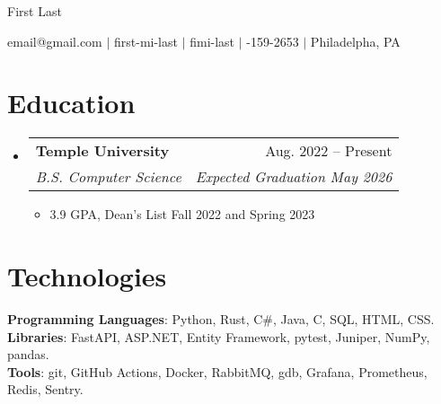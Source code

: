 \documentclass[letterpaper,11pt]{article}
\makeatletter
\newcommand{\resumeItem}[1]{
  \item\small{
    {#1 \vspace{-2pt}}
  }
}
\newcommand{\resumeSubheading}[4]{
  \vspace{-2pt}\item
    \begin{tabular*}{0.97\textwidth}[t]{l@{\extracolsep{\fill}}r}
      \textbf{#1} & #2 \\
      \textit{\small#3} & \textit{\small #4} \\
    \end{tabular*}\vspace{-7pt}
}
\newcommand{\resumeSubheadingListStart}{\begin{itemize}[leftmargin=0.15in, label={}]}
\newcommand{\resumeSubheadingListEnd}{\end{itemize}}
\newcommand{\resumeItemListStart}{\begin{itemize}}
\newcommand{\resumeItemListEnd}{\end{itemize}\vspace{-5pt}}
\newcommand{\myemail}{email@gmail.com}
\newcommand{\myname}{First Last}
\newcommand{\mygh}{first-mi-last}
\newcommand{\mylinkedin}{fimi-last}
\newcommand{\myphone}{314-159-2653}
\newcommand{\myemail}{jonathanzhang929@gmail.com}
\newcommand{\myname}{Jonathan Zhang}
\newcommand{\mygh}{jonathan-d-zhang}
\newcommand{\mylinkedin}{jd-zhang}
\newcommand{\myphone}{484-986-8012}
\makeatother
\begin{document}
{\Huge \myname}
\\
\vspace{2pt}

\small{
    \faEnvelope
    \thinspace \thinspace
    \myemail
    \thinspace \thinspace $|$
    \faGithub
    \thinspace \thinspace
    \mygh
    \thinspace \thinspace $|$
    \faLinkedin
    \thinspace \thinspace
    \mylinkedin
    \thinspace \thinspace $|$
    \faPhone
    \thinspace \thinspace
    \myphone
    \thinspace \thinspace $|$
    \thinspace \thinspace
    Philadelpha, PA
}

\vspace{-11pt}

\section{Education}
  \resumeSubheadingListStart
    \resumeSubheading{Temple University}{Aug. 2022 -- Present}{B.S. Computer Science}{Expected Graduation May 2026}
    \resumeItemListStart
        \resumeItem{3.9 GPA, Dean's List Fall 2022 and Spring 2023}
    \resumeItemListEnd
  \resumeSubheadingListEnd

\section{Technologies}
 \begin{itemize}[leftmargin=0.15in, label={}]
    \small{\item{
    \textbf{Programming Languages}{:
        Python,
        Rust,
        C\#,
        Java,
        C,
        SQL,
        HTML,
        CSS.
    } \\
    \textbf{Libraries}{:
        FastAPI,
        ASP.NET,
        Entity Framework,
        pytest,
        Juniper,
        NumPy,
        pandas.
    } \\
    \textbf{Tools}{:
        git,
        GitHub Actions,
        Docker,
        RabbitMQ,
        gdb,
        Grafana,
        Prometheus,
        Redis,
        Sentry.
    }
    }}
 \end{itemize}
\end{document}
